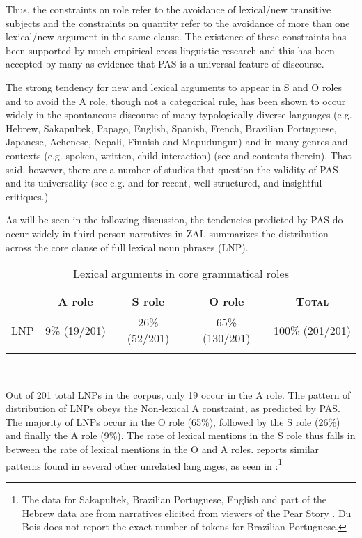 Thus, the constraints on role refer to the avoidance of lexical/new transitive subjects and the constraints on quantity refer to the avoidance of more than one lexical/new argument in the same clause. The existence of these constraints has been supported by much empirical cross-linguistic research and this has been accepted by many as evidence that PAS is a universal feature of discourse.  

The strong tendency for new and lexical arguments to appear in S and O roles and to avoid the A role, though not a categorical rule, has been shown to occur widely in the spontaneous discourse of many typologically diverse languages (e.g. Hebrew, Sakapultek, Papago, English, Spanish, French, Brazilian Portuguese, Japanese, Achenese, Nepali, Finnish and Mapudungun) and in many genres and contexts (e.g. spoken, written, child interaction) (see \citealt{dubois2003} and contents therein). That said, however, there are a number of studies that question the validity of PAS and its universality (see e.g. \citealt{haig2016} and \citealt{schnell2017} for recent, well-structured, and insightful critiques.)

As will be seen in the following discussion, the tendencies predicted by PAS do occur widely in third-person narratives in ZAI.  summarizes the distribution across the core clause of full lexical noun phrases (LNP).


\begin{table} 
\begin{center}
\caption{{Lexical arguments in core grammatical roles}}
\begin{tabular}{| l  c  c  c  c }
\lsptoprule
 & A role & S role & O role & \textsc{Total} \\

\midrule
 \textsc{LNP} & 9{\%} (19/201) & 26{\%}(52/201) & 65{\%} (130/201) & 100{\%} (201/201) \\
  
\lspbottomrule
\end{tabular}\\
\label{generaldist}
\end{center}
\end{table}

Out of 201 total LNPs in the corpus, only 19 occur in the A role. The pattern of distribution of LNPs obeys the Non-lexical A constraint, as predicted by PAS. The majority of LNPs occur in the O role (65{\%}), followed by the S role (26{\%}) and finally the A role (9{\%}).  The rate of lexical mentions in the S role thus falls in between the rate of lexical mentions in the O and A roles. \citet[37]{dubois2003b} reports similar patterns found in several other unrelated languages, as seen in :\footnote{The data for Sakapultek, Brazilian Portuguese, English and part of the Hebrew data are from narratives elicited from viewers of the Pear Story \citep[62-63]{dubois2003a}. Du Bois does not report the exact number of tokens for Brazilian Portuguese.}


